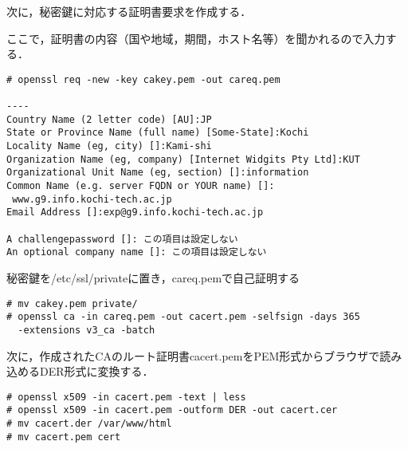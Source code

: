 \documentclass[a4j,titlepage]{jarticle}
\begin{document}
\begin{enumerate}
\begin{itemize}
次に，秘密鍵に対応する証明書要求を作成する．

ここで，証明書の内容（国や地域，期間，ホスト名等）を聞かれるので入力する．

\begin{center}
\begin{screen}
\begin{verbatim}
# openssl req -new -key cakey.pem -out careq.pem

----
Country Name (2 letter code) [AU]:JP
State or Province Name (full name) [Some-State]:Kochi
Locality Name (eg, city) []:Kami-shi
Organization Name (eg, company) [Internet Widgits Pty Ltd]:KUT
Organizational Unit Name (eg, section) []:information
Common Name (e.g. server FQDN or YOUR name) []:
 www.g9.info.kochi-tech.ac.jp
Email Address []:exp@g9.info.kochi-tech.ac.jp

A challengepassword []: この項目は設定しない
An optional company name []: この項目は設定しない
\end{verbatim}
\end{screen}
\end{center}

秘密鍵を/etc/ssl/privateに置き，careq.pemで自己証明する

\begin{center}
\begin{screen}
\begin{verbatim}
# mv cakey.pem private/
# openssl ca -in careq.pem -out cacert.pem -selfsign -days 365
  -extensions v3_ca -batch
\end{verbatim}
\end{screen}
\end{center}

次に，作成されたCAのルート証明書cacert.pemをPEM形式からブラウザで読み込めるDER形式に変換する．

\begin{center}
\begin{screen}
\begin{verbatim}
# openssl x509 -in cacert.pem -text | less
# openssl x509 -in cacert.pem -outform DER -out cacert.cer
# mv cacert.der /var/www/html
# mv cacert.pem cert
\end{verbatim}
\end{screen}
\end{center}


\end{itemize}
\end{enumerate}
\end{document}

